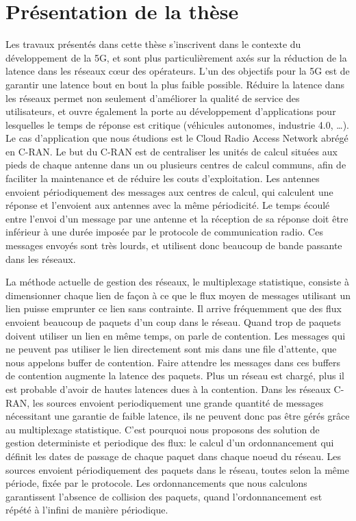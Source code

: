 
\chapter*{Présentation de la thèse}
\label{chap:introfr}


Les travaux présentés dans cette thèse s'inscrivent dans le contexte du développement de la 5G, et sont plus particulièrement axés sur la réduction de la latence dans les réseaux cœur des opérateurs.
L'un des objectifs pour la 5G est de garantir une latence bout en bout la plus faible possible.
Réduire la latence dans les réseaux permet non seulement d'améliorer la qualité de service des utilisateurs, et ouvre également la porte au développement d'applications pour lesquelles le temps de réponse est critique (véhicules autonomes, industrie 4.0, \ldots).
Le cas d'application que nous étudions est le Cloud Radio Access Network abrégé en C-RAN. Le but du C-RAN est de centraliser les unités de calcul situées aux pieds de chaque antenne dans un ou plusieurs centres de calcul communs, afin de faciliter la maintenance et de réduire les couts d'exploitation. Les antennes envoient périodiquement des messages aux centres de calcul, qui calculent une réponse et l'envoient aux antennes avec la même périodicité. Le temps écoulé entre l'envoi d'un message par une antenne et la réception de sa réponse doit être inférieur à une durée imposée par le protocole de communication radio. Ces messages envoyés sont très lourds, et utilisent donc beaucoup de bande passante dans les réseaux.

La méthode actuelle de gestion des réseaux, le multiplexage statistique, consiste à dimensionner chaque lien de façon à ce que le flux moyen de messages utilisant un lien puisse emprunter ce lien sans contrainte. Il arrive fréquemment que des flux envoient beaucoup de paquets d'un coup dans le réseau. Quand trop de paquets doivent utiliser un lien en même temps, on parle de contention. Les messages qui ne peuvent pas utiliser le lien directement sont mis dans une file d'attente, que nous appelons buffer de contention. Faire attendre les messages dans ces buffers de contention augmente la latence des paquets. Plus un réseau est chargé, plus il est probable d'avoir de hautes latences dues à la contention. Dans les réseaux C-RAN, les sources envoient periodiquement une grande quantité de messages nécessitant une garantie de faible latence, ils ne peuvent donc pas être gérés grâce au multiplexage statistique. C'est pourquoi nous proposons des solution de gestion deterministe et periodique des flux: le calcul d'un ordonnancement qui définit les dates de passage de chaque paquet dans chaque noeud du réseau. Les sources envoient périodiquement des paquets dans le réseau, toutes selon la même période, fixée par le protocole. Les ordonnancements que nous calculons garantissent l'absence de collision des paquets, quand l'ordonnancement est répété à l'infini de manière périodique.

